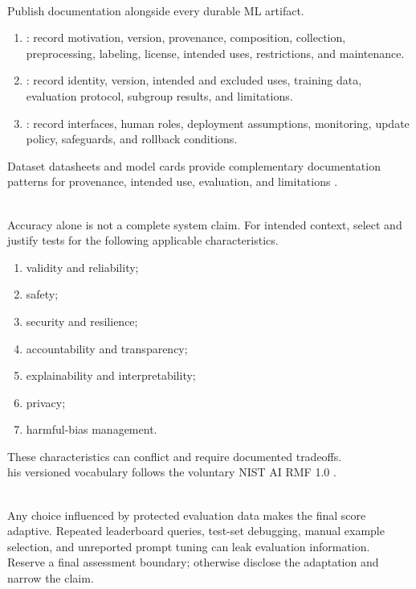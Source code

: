\begin{process} \label{proc:ml-artifact-documentation} \\
Publish documentation alongside every durable ML artifact.
\begin{enumerate}[label=(\roman*)]
\setlength{\itemsep}{0pt}
\item {}: record motivation, version, provenance, composition, collection, preprocessing, labeling, license, intended uses, restrictions, and maintenance.
\item {}: record identity, version, intended and excluded uses, training data, evaluation protocol, subgroup results, and limitations.
\item {}: record interfaces, human roles, deployment assumptions, monitoring, update policy, safeguards, and rollback conditions.
\end{enumerate}
Dataset datasheets and model cards provide complementary documentation patterns for provenance, intended use, evaluation, and limitations \citep{gebru2021datasheets,mitchell2019modelcards}.
\end{process}

\begin{principle} \label{princ:contextual-ai-risk} \\
Accuracy alone is not a complete system claim. For intended context, select and justify tests for the following applicable characteristics.
\begin{enumerate}[label=(\roman*)]
\setlength{\itemsep}{0pt}
\item validity and reliability;
\item safety;
\item security and resilience;
\item accountability and transparency;
\item explainability and interpretability;
\item privacy;
\item harmful-bias management.
\end{enumerate}
These characteristics can conflict and require documented tradeoffs. \\
his versioned vocabulary follows the voluntary NIST AI RMF 1.0 \citep{tabassi2023airmf}.
\end{principle}

\begin{warning} \label{warn:ml-evaluation-leakage} \\
Any choice influenced by protected evaluation data makes the final score adaptive. Repeated leaderboard queries, test-set debugging, manual example selection, and unreported prompt tuning can leak evaluation information.\\
Reserve a final assessment boundary; otherwise disclose the adaptation and narrow the claim.
\end{warning}

